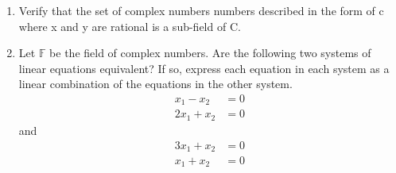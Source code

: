 \renewcommand{\theequation}{\theenumi}
\renewcommand{\thefigure}{\theenumi}
\begin{enumerate}[label=\thesubsection.\arabic*.,ref=\thesubsection.\theenumi]
%
\item  Verify that the set of complex numbers numbers described in the form of c where x and y are rational is a sub-field of C.
\\
\solution

\item Let $\mathbb{F}$ be the field of complex numbers. Are the following two systems of linear equations equivalent? If so, express each equation in each system as a linear combination of the equations in the other system.
\begin{align*}
    x_1 - x_2 &=0\\
    2x_1 + x_2 &=0
\end{align*}
and 
\begin{align*}
    3x_1 + x_2 &=0 \\
    x_1 + x_2 &=0
\end{align*}
%
\solution



\end{enumerate}
